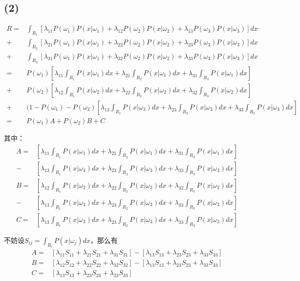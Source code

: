 \documentclass{ctexart}
\begin{document}
\subsection*{(2)}
\begin{align*}
R=&\int_{R_1}[\lambda_{11}P(\omega_1)P(x|\omega_1)+\lambda_{12}P(\omega_2)P(x|\omega_2)+\lambda_{13}P(\omega_3)P(x|\omega_3)]dx\\
 +&\int_{R_2}[\lambda_{21}P(\omega_1)P(x|\omega_1)+\lambda_{22}P(\omega_2)P(x|\omega_2)+\lambda_{23}P(\omega_3)P(x|\omega_3)]dx\\
 +&\int_{R_3}[\lambda_{31}P(\omega_1)P(x|\omega_1)+\lambda_{32}P(\omega_2)P(x|\omega_2)+\lambda_{33}P(\omega_3)P(x|\omega_3)]dx\\
 =&P(\omega_1)[\lambda_{11}\int_{R_1}P(x|\omega_1)dx+\lambda_{21}\int_{R_2}P(x|\omega_1)dx+\lambda_{31}\int_{R_3}P(x|\omega_1)dx]\\
 +&P(\omega_2)[\lambda_{12}\int_{R_1}P(x|\omega_2)dx+\lambda_{22}\int_{R_2}P(x|\omega_2)dx+\lambda_{32}\int_{R_3}P(x|\omega_2)dx]\\
 +&(1-P(\omega_1)-P(\omega_2)[\lambda_{13}\int_{R_1}P(x|\omega_3)dx+\lambda_{23}\int_{R_2}P(x|\omega_3)dx+\lambda_{33}\int_{R_3}P(x|\omega_3)dx]\\
 =&P(\omega_1)A+P(\omega_2)B+C
\end{align*}

其中：
\begin{align*}
A=&[\lambda_{11}\int_{R_1}P(x|\omega_1)dx+\lambda_{21}\int_{R_2}P(x|\omega_1)dx+\lambda_{31}\int_{R_3}P(x|\omega_1)dx]\\
 -&[\lambda_{13}\int_{R_1}P(x|\omega_3)dx+\lambda_{23}\int_{R_2}P(x|\omega_3)dx+\lambda_{33}\int_{R_3}P(x|\omega_3)dx]\\
B=&[\lambda_{12}\int_{R_1}P(x|\omega_2)dx+\lambda_{22}\int_{R_2}P(x|\omega_2)dx+\lambda_{32}\int_{R_3}P(x|\omega_2)dx]\\
 -&[\lambda_{13}\int_{R_1}P(x|\omega_3)dx+\lambda_{23}\int_{R_2}P(x|\omega_3)dx+\lambda_{33}\int_{R_3}P(x|\omega_3)dx]\\
C=&[\lambda_{13}\int_{R_1}P(x|\omega_3)dx+\lambda_{23}\int_{R_2}P(x|\omega_3)dx+\lambda_{33}\int_{R_3}P(x|\omega_3)dx]
\end{align*}

不妨设$S_{ij}=\int_{R_i}P(x|\omega_j)dx$，那么有
\begin{align*}
A=&[\lambda_{11}S_{11}+\lambda_{21}S_{21}+\lambda_{31}S_{31}]-[\lambda_{13}S_{13}+\lambda_{23}S_{23}+\lambda_{33}S_{33}]\\
B=&[\lambda_{12}S_{12}+\lambda_{22}S_{22}+\lambda_{32}S_{32}]-[\lambda_{13}S_{13}+\lambda_{23}S_{23}+\lambda_{33}S_{33}]\\
C=&[\lambda_{13}S_{13}+\lambda_{23}S_{23}+\lambda_{33}S_{33}]
\end{align*}
\end{document}
